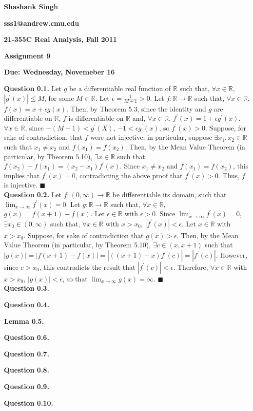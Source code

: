 \documentclass{article}
\begin{document}
\begin{center}
\textbf{Shashank Singh}

\textbf{sss1@andrew.cmu.edu}

\textbf{21-355C \quad Real Analysis, Fall 2011}

\textbf{Assignment 9}

\textbf{Due: Wednesday, Novemeber 16}
\end{center}

\textbf{Question 0.1.} Let $g$ be a differentiable real function of
$\mathbb{R}$ such that, $\forall x \in \mathbb{R}$, $|g^{\prime}(x)| \leq M$,
for some $M \in \mathbb{R}$. Let $\epsilon = \frac{1}{M + 1} > 0$. Let
$f: \mathbb{R} \rightarrow \mathbb{R}$ such that, $\forall x \in \mathbb{R}$,
$f(x) = x + \epsilon g(x)$. Then, by Theorem 5.3, since the identity and $g$
are differentiable on $\mathbb{R}$, $f$ is differentiable on $\mathbb{R}$ and,
$\forall x \in \mathbb{R}$, $f^{\prime}(x) = 1 + \epsilon g^{\prime}(x)$.
$\forall x \in \mathbb{R}$, since $-(M + 1) < g^{\prime}(X)$, $-1 < \epsilon
g^{\prime}(x)$, so $f^{\prime}(x) > 0$. Suppose, for sake of contradiction,
that $f$ were not injective; in particular, suppose $\exists x_1, x_2 \in
\mathbb{R}$ such that $x_1 \neq x_2$ and $f(x_1) = f(x_2)$. Then, by the
Mean Value Theorem (in particular, by Theorem 5.10), $\exists x \in \mathbb{R}$
such that $f(x_2) - f(x_1) = (x_2 - x_1)f^{\prime}(x)$. Since $x_1 \neq x_2$
and $f(x_1) = f(x_2)$, this implies that $f^{\prime}(x) = 0$, contradicting
the above proof that $f^{\prime}(x) > 0$. Thus, $f$ is injective.
\qquad $\blacksquare$ \\

\textbf{Question 0.2.} Let $f: (0, \infty) \rightarrow \mathbb{R}$ be
differentiable its domain, such that $\lim_{x \rightarrow \infty}
f^{\prime}(x) = 0$. Let $g: \mathbb{R} \rightarrow \mathbb{R}$ such that,
$\forall x \in \mathbb{R}$, $g(x) = f(x + 1) - f(x)$. Let $\epsilon \in
\mathbb{R}$ with $\epsilon > 0$. Since $\lim_{x \rightarrow \infty}
f^{\prime}(x) = 0$, $\exists x_0 \in (0,\infty)$ such that, $\forall x \in
\mathbb{R}$ with $x > x_0$, $|f^{\prime}(x)| < \epsilon$. Let $x \in
\mathbb{R}$ with $x > x_0$. Suppose, for sake of contradiction that $g(x) >
\epsilon$. Then, by the Mean Value Theorem (in particular, by Theorem 5.10),
$\exists c \in (x, x + 1)$ such that $|g(x)| = |f(x + 1) - f(x)| =
|((x + 1) - x) f^{\prime}(c)| = |f^{\prime}(c)|$. However, since $c > x_0$,
this contradicts the result that $|f^{\prime}(c)| < \epsilon$. Therefore,
$\forall x \in \mathbb{R}$ with $x > x_0$, $|g(x)| < \epsilon$, so that
$\lim_{x \rightarrow \infty} g(x) = \infty$. \qquad $\blacksquare$ \\

\textbf{Question 0.3.}

\textbf{Question 0.4.}

\textbf{Lemma 0.5.}

\textbf{Question 0.6.}

\textbf{Question 0.7.}

\textbf{Question 0.8.}

\textbf{Question 0.9.}

\textbf{Question 0.10.}
\end{document}
